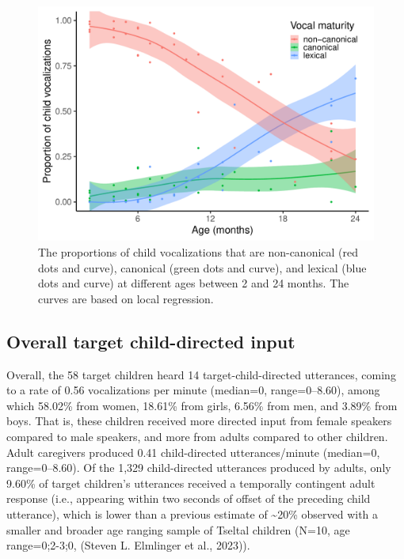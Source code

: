 \documentclass[
  man]{apa6}
\begin{document}
\begin{figure}
\centering
\includegraphics{turntaking_paper_files/figure-latex/vcm-trajectories-plot-1.pdf}
\caption{\label{fig:vcm-trajectories-plot}The proportions of child vocalizations that are non-canonical (red dots and curve), canonical (green dots and curve), and lexical (blue dots and curve) at different ages between 2 and 24 months. The curves are based on local regression.}
\end{figure}

\hypertarget{overall-target-child-directed-input}{%
\subsection{Overall target child-directed input}\label{overall-target-child-directed-input}}

Overall, the 58 target children heard 14 target-child-directed utterances, coming to a rate of 0.56 vocalizations per minute (median=0, range=0--8.60), among which 58.02\% from women, 18.61\% from girls, 6.56\% from men, and 3.89\% from boys. That is, these children received more directed input from female speakers compared to male speakers, and more from adults compared to other children. Adult caregivers produced 0.41 child-directed utterances/minute (median=0, range=0--8.60). Of the 1,329 child-directed utterances produced by adults, only 9.60\% of target children's utterances received a temporally contingent adult response (i.e., appearing within two seconds of offset of the preceding child utterance), which is lower than a previous estimate of \textasciitilde20\% observed with a smaller and broader age ranging sample of Tseltal children (N=10, age range=0;2-3;0, (Steven L. Elmlinger et al., 2023)).
\end{document}
